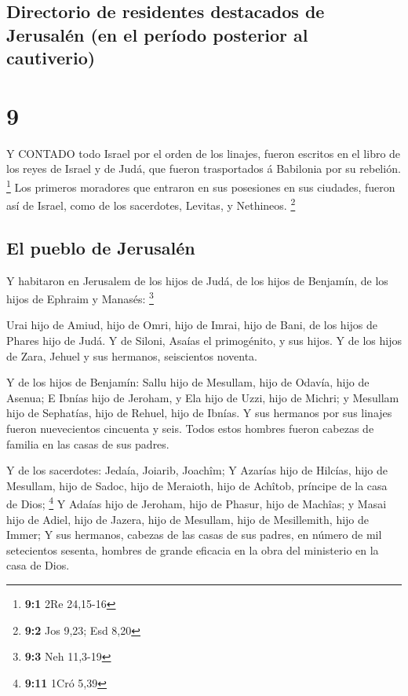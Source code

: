 \hypertarget{directorio-de-residentes-destacados-de-jerusaluxe9n-en-el-peruxedodo-posterior-al-cautiverio}{%
\subsection{Directorio de residentes destacados de Jerusalén (en el
período posterior al
cautiverio)}\label{directorio-de-residentes-destacados-de-jerusaluxe9n-en-el-peruxedodo-posterior-al-cautiverio}}

\hypertarget{section-8}{%
\section{9}\label{section-8}}

 Y CONTADO todo Israel por el orden de los linajes, fueron
escritos en el libro de los reyes de Israel y de Judá, que fueron
trasportados á Babilonia por su rebelión. \footnote{\textbf{9:1} 2Re
  24,15-16}  Los primeros moradores que entraron en sus
posesiones en sus ciudades, fueron así de Israel, como de los
sacerdotes, Levitas, y Nethineos. \footnote{\textbf{9:2} Jos 9,23; Esd
  8,20}

\hypertarget{el-pueblo-de-jerusaluxe9n}{%
\subsection{El pueblo de Jerusalén}\label{el-pueblo-de-jerusaluxe9n}}

 Y habitaron en Jerusalem de los hijos de Judá, de los hijos
de Benjamín, de los hijos de Ephraim y Manasés: \footnote{\textbf{9:3}
  Neh 11,3-19}

 Urai hijo de Amiud, hijo de Omri, hijo de Imrai, hijo de
Bani, de los hijos de Phares hijo de Judá.  Y de Siloni,
Asaías el primogénito, y sus hijos.  Y de los hijos de Zara,
Jehuel y sus hermanos, seiscientos noventa.

 Y de los hijos de Benjamín: Sallu hijo de Mesullam, hijo de
Odavía, hijo de Asenua;  E Ibnías hijo de Jeroham, y Ela
hijo de Uzzi, hijo de Michri; y Mesullam hijo de Sephatías, hijo de
Rehuel, hijo de Ibnías.  Y sus hermanos por sus linajes
fueron nuevecientos cincuenta y seis. Todos estos hombres fueron cabezas
de familia en las casas de sus padres.

 Y de los sacerdotes: Jedaía, Joiarib, Joachîm;
 Y Azarías hijo de Hilcías, hijo de Mesullam, hijo de
Sadoc, hijo de Meraioth, hijo de Achîtob, príncipe de la casa de Dios;
\footnote{\textbf{9:11} 1Cró 5,39}  Y Adaías hijo de
Jeroham, hijo de Phasur, hijo de Machîas; y Masai hijo de Adiel, hijo de
Jazera, hijo de Mesullam, hijo de Mesillemith, hijo de Immer;
 Y sus hermanos, cabezas de las casas de sus padres, en
número de mil setecientos sesenta, hombres de grande eficacia en la obra
del ministerio en la casa de Dios.

